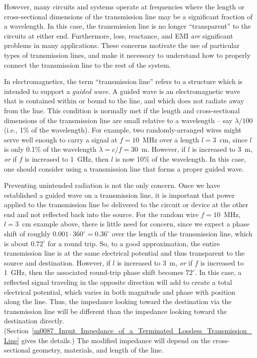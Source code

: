 However, many circuits and systems operate at frequencies where the length or cross-sectional dimensions of the transmission line may be a significant fraction of a wavelength. In this case, the transmission line is no longer ``transparent'' to the circuits at either end.
Furthermore, loss, reactance, and EMI \emph{are} significant problems in many applications.
These concerns motivate the use of particular types of transmission lines, and make it necessary to understand how to properly connect the transmission line to the rest of the system.

In electromagnetics, the term ``transmission line'' refers to a structure which is intended to support a \emph{guided wave}.
A guided wave is an electromagnetic wave that is contained within or bound to the line, and which does not radiate away from the line.  
This condition is normally met if the length and cross-sectional dimensions of the transmission line are small relative to a wavelength -- say $\lambda/100$ (i.e., 1\% of the wavelength). 
For example, two randomly-arranged wires might serve well enough to carry a signal at $f=10$~MHz over a length $l=3$~cm, since $l$ is only 0.1\% of the wavelength $\lambda=c/f=30$~m.  
However, if $l$ is increased to $3$~m, \emph{or} if $f$ is increased to 1~GHz, then $l$ is now 10\% of the wavelength.
In this case, one should consider using a transmission line that forms a proper guided wave. %

Preventing unintended radiation is not the only concern.
Once we have established a guided wave on a transmission line, it is important that power applied to the transmission line be delivered to the circuit or device at the other end and not reflected back into the source.
For the random wire $f=10$~MHz, $l=3$~cm example above, there is little need for concern, since we expect a phase shift of roughly $0.001\cdot 360^{\circ} = 0.36^{\circ}$ over the length of the transmission line, which is about $0.72^{\circ}$ for a round trip.  So, to a good approximation, the entire transmission line is at the same electrical potential and thus transparent to the source and destination.
However, if $l$ is increased to $3$~m, \emph{or} if $f$ is increased to 1~GHz, then the associated round-trip phase shift becomes $72^{\circ}$.  In this case, a reflected signal traveling in the opposite direction will add to create a total electrical potential, which varies in both magnitude and phase with position along the line. 
Thus, the impedance looking toward the destination via the transmission line will be different than the impedance looking toward the destination directly.
(Section~\ref{m0087_Input_Impedance_of_a_Terminated_Lossless_Transmission_Line} gives the details.)
The modified impedance will depend on the cross-sectional geometry, materials, and length of the line.  
     
